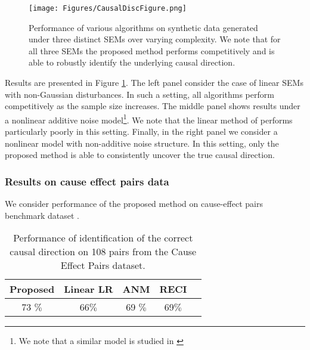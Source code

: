 \documentclass[]{article}
\begin{document}




\begin{figure}[ht]
\vskip 0.2in
\begin{center}
\centerline{\texttt{[image: Figures/CausalDiscFigure.png]}}
\caption{Performance of various algorithms on synthetic data generated under three
distinct SEMs over varying complexity. We note that for all three SEMs the proposed
method performs competitively and is able to robustly identify the underlying causal direction. }
\label{Fig:causalDiscSimulations}
\end{center}
\vskip -0.2in
\end{figure}

Results are presented in Figure \ref{Fig:causalDiscSimulations}. 
The left panel consider the case of linear SEMs with non-Gaussian disturbances. In such a setting, all
algorithms perform competitively as the sample size increases. 
The middle panel shows results under a nonlinear additive noise model\footnote{We note that a 
similar model is studied in \cite{Hoyer2009}}. 
We note that the linear method of \cite{Hyvarinen2013} performs particularly 
poorly in this setting. 
Finally, in the right panel we consider a nonlinear model with non-additive noise structure. 
In this setting, only the proposed method is able to consistently uncover the true causal direction. 

\subsubsection*{Results on cause effect pairs data}

We consider performance of the proposed method on cause-effect pairs benchmark dataset
\citep{mooij2016distinguishing}. 

\begin{table}[h!]
	\caption{Performance of identification of the  correct 
		causal direction on 108 pairs from the Cause Effect Pairs dataset.}
	\label{sample-table}
	\vskip 0.15in
	\begin{center}
		\begin{small}
			\begin{sc}
				\begin{tabular}{ccccr}
					\toprule
					 Proposed & Linear LR & ANM  & RECI    \\
					\midrule
					  73 $\%$ & 66$\%$ & 69 $\%$   &  69$\%$ \\
					\bottomrule
				\end{tabular}
			\end{sc}
		\end{small}
	\end{center}
	\vskip -0.1in
\end{table}
\end{document}
